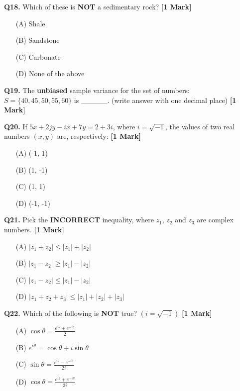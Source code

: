 \documentclass[11pt]{article}
\newcommand{\questiona}[2]{
    \noindent\textbf{Q#2.} #1 \hfill \textbf{[1 Mark]}
}
\begin{document}
\questiona{Which of these is \textbf{NOT} a sedimentary rock?}{18}
\begin{enumerate}
    \item[(A)] Shale  
    \item[(B)] Sandstone  
    \item[(C)] Carbonate  
    \item[(D)] None of the above  
\end{enumerate}
\vspace{0.5cm}

\questiona{The \textbf{unbiased} sample variance for the set of numbers: \( S = \{40, 45, 50, 55, 60\} \) is \_\_\_\_\_. (write answer with one decimal place)}{19}
\vspace{0.5cm}

\questiona{If \( 5x + 2jy - ix + 7y = 2 + 3i \), where \( i = \sqrt{-1} \), the values of two real numbers \((x, y)\) are, respectively:}{20}
\begin{enumerate}
    \item[(A)] (-1, 1)  
    \item[(B)] (1, -1)  
    \item[(C)] (1, 1)  
    \item[(D)] (-1, -1)  
\end{enumerate}
\vspace{0.5cm}

\questiona{Pick the \textbf{INCORRECT} inequality, where \( z_1 \), \( z_2 \) and \( z_3 \) are complex numbers.}{21}
\begin{enumerate}
    \item[(A)] \( |z_1 + z_2| \leq |z_1| + |z_2| \)  
    \item[(B)] \( |z_1 - z_2| \geq |z_1| - |z_2| \)  
    \item[(C)] \( |z_1 - z_2| \leq |z_1| - |z_2| \)  
    \item[(D)] \( |z_1 + z_2 + z_3| \leq |z_1| + |z_2| + |z_3| \)  
\end{enumerate}
\vspace{0.5cm}

\questiona{Which of the following is \textbf{NOT} true? \((i = \sqrt{-1})\)}{22}
\begin{enumerate}
    \item[(A)] \(\cos \theta = \frac{e^{i\theta} + e^{-i\theta}}{2} \)  
    \item[(B)] \( e^{i\theta} = \cos \theta + i \sin \theta \)  
    \item[(C)] \(\sin \theta = \frac{e^{i\theta} - e^{-i\theta}}{2i} \)  
    \item[(D)] \(\cos \theta = \frac{e^{i\theta} + e^{-i\theta}}{2i} \)  
\end{enumerate}
\vspace{0.5cm}
\end{document}

